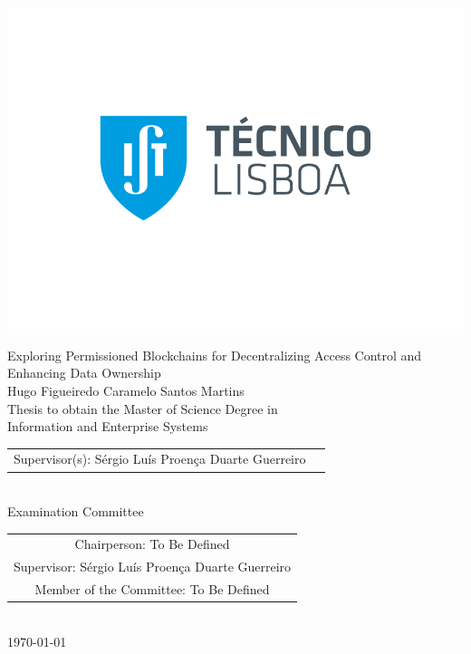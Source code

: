 \includegraphics[bb=9.5cm 11cm 0cm 0cm,scale=0.29]{images/IST_A_RGB_POS.png}

\begin{center}
    \vspace{2.5cm}

    \vspace{1.5cm}
    {\FontLb Exploring Permissioned Blockchains for Decentralizing Access Control and Enhancing Data Ownership} \\
    \vspace{1.5cm}  
    {\FontMb Hugo Figueiredo Caramelo Santos Martins} \\
    \vspace{1.5cm}
    {\FontSn Thesis to obtain the Master of Science Degree in} \\
    \vspace{0.3cm}
    {\FontLb Information and Enterprise Systems} \\
    \vspace{1.5cm}
    {\FontSn %
        \begin{tabular}{ll}
            Supervisor(s): Sérgio Luís Proença Duarte Guerreiro
        \end{tabular} } \\
    \vspace{1.5cm}
    {\FontMb Examination Committee} \\
    \vspace{0.3cm}
    {\FontSn %
        \begin{tabular}{c}
            Chairperson:     To Be Defined \\ 
            Supervisor: Sérgio Luís Proença Duarte Guerreiro \\ 
            Member of the Committee: To Be Defined  
        \end{tabular} } \\
    \vspace*{\fill}
    {\FontMb \today}
\end{center}